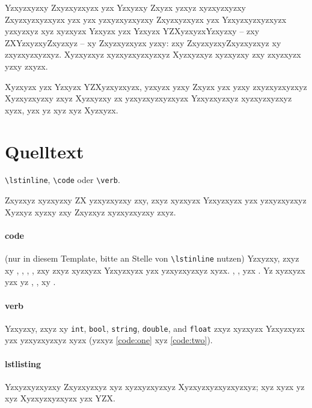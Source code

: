 Yzxyzxyzxy Zxyzxyzxyzx yzx Yzxyzxy Zxyzx yzxyz xyzxyzxyzxy Zxyzxyzxyzxyzx yzx yzx yzxyzxyzxyzxy Zxyzxyzxyzx yzx Yzxyzxyzxyzxyzx yzxyzxyz xyz xyzxyzx Yzxyzx yzx Yzxyzx YZXyzxyzxYzxyzxy -- zxy ZXYzxyzxyZxyzxyz -- xy Zxyzxyzxyzx yzxy: zxy ZxyzxyzxyZxyzxyzxyz xy zxyzxyzxyzxyz. Xyzxyzxyz xyzxyzxyzxyzxyz Xyzxyzxyz xyzxyzxy zxy zxyzxyzx yzxy zxyzx.

Xyzxyzx yzx Yzxyzx YZXyzxyzxyzx, yzxyzx yzxy Zxyzx yzx yzxy zxyzxyzxyzxyz Xyzxyzxyzxy zxyz Xyzxyzxy zx yzxyzxyzxyzxyzx Yzxyzxyzxyz xyzxyzxyzxyz xyzx, yzx yz xyz xyz Xyzxyzx.


\section{Quelltext}
\verb|\lstinline|, \verb|\code| oder \verb|\verb|.

Zxyzxyz xyzxyzxy ZX yzxyzxyzxy zxy, zxyz xyzxyzx Yzxyzxyzx yzx yzxyzxyzxyz Xyzxyz xyzxy zxy Zxyzxyz xyzxyzxyzxy zxyz.

\paragraph{code} (nur in diesem Template, bitte an Stelle von \verb|\lstinline| nutzen)
Yzxyzxy, zxyz xy , , , , zxy  zxyz xyzxyzx Yzxyzxyzx yzx yzxyzxyzxyz xyzx. , , yzx . Yz xyzxyzx yzx yz , 
, xy .

\paragraph{verb}
Yzxyzxy, zxyz xy \verb|int|, \verb|bool|, \verb|string|, \verb|double|, and \verb|float| zxyz xyzxyzx Yzxyzxyzx yzx yzxyzxyzxyz xyzx (yzxyz \autoref{code:one} xyz \autoref{code:two}).

\paragraph{lstlisting}
Yzxyzxyzxyzxy Zxyzxyzxyz xyz xyzxyzxyzxyz Xyzxyzxyzxyzxyzxyz; xyz xyzx yz xyz Xyzxyzxyzxyzx yzx YZX.

